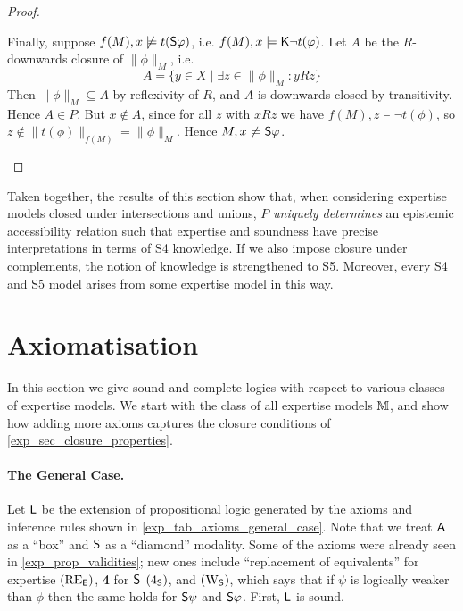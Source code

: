 \begin{proof}
\begin{itemize}
              Finally, suppose $f(M), x \not\models t(\S\phi)$, i.e.  $f(M), x
              \models \K\neg t(\phi)$. Let $A$ be the $R$-downwards closure of
              $\|\phi\|_M$, i.e.
              \[
                  A = \{y \in X \mid \exists z \in \|\phi\|_M: yRz\}
              \]
              Then $\|\phi\|_M \subseteq A$ by reflexivity of $R$, and $A$ is
              downwards closed by transitivity.  Hence $A \in P$.  But $x
              \notin A$, since for all $z$ with $xRz$ we have $f(M), z \models
              \neg t(\phi)$, so $z \notin \|t(\phi)\|_{f(M)} = \|\phi\|_M$.
              Hence $M, x \not\models \S\phi$.
    \end{itemize}
\end{proof}

Taken together, the results of this section show that, when considering
expertise models closed under intersections and unions, $P$ \emph{uniquely determines}
an epistemic accessibility relation such that expertise and soundness have
precise interpretations in terms of S4 knowledge. If we also impose closure
under complements, the notion of knowledge is strengthened to S5. Moreover,
every S4 and S5 model arises from some expertise model in this way.

\section{Axiomatisation}
\label{exp_sec_axiomatisation}

In this section we give sound and complete logics with respect to various
classes of expertise models. We start with the class of all expertise
models $\M$, and show how adding more axioms captures the closure conditions of
\cref{exp_sec_closure_properties}.

\paragraph{The General Case.}

Let $\sL$ be the extension of propositional logic generated by the axioms and
inference rules shown in \cref{exp_tab_axioms_general_case}. Note that we treat
$\A$ as a ``box'' and $\S$ as a ``diamond'' modality. Some of the axioms were
already seen in \cref{exp_prop_validities}; new ones include ``replacement of
equivalents'' for expertise $\reE$, \textbf{4} for $\S$ $\foursoundness$,
and $\weakeningS$, which says that if $\psi$ is logically weaker than $\phi$
then the same holds for $\S\psi$ and $\S\phi$. First, $\sL$ is sound.

